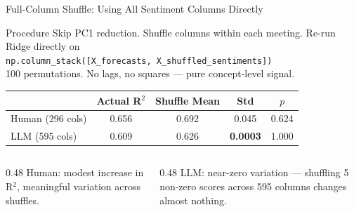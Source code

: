 \documentclass[10pt,aspectratio=169]{beamer}
\begin{document}
\begin{frame}{Full-Column Shuffle: Using All Sentiment Columns Directly}
  \vspace{-4pt}
  \begin{block}{Procedure}
    \centering\small
    Skip PC1 reduction. Shuffle columns within each meeting. Re-run Ridge directly on\\[2pt]
    \texttt{np.column\_stack([X\_forecasts, X\_shuffled\_sentiments])}\\[2pt]
    100 permutations. \quad No lags, no squares --- pure concept-level signal.
  \end{block}
  \vspace{4pt}
  \begin{center}
    \footnotesize
    \begin{tabular}{lcccc}
      \toprule
      & \textbf{Actual R$^2$} & \textbf{Shuffle Mean} & \textbf{Std} & \textbf{$p$} \\
      \midrule
      Human (296 cols)  & 0.656 & 0.692 & 0.045 & 0.624 \\
      LLM (595 cols)    & 0.609 & 0.626 & \textbf{0.0003} & 1.000 \\
      \bottomrule
    \end{tabular}
  \end{center}
  \vspace{4pt}
  \begin{columns}[T]
    \begin{column}{0.48\textwidth}
      \centering\small Human: modest increase in R$^2$, meaningful variation across shuffles.
    \end{column}
    \begin{column}{0.48\textwidth}
      \centering\small LLM: near-zero variation --- shuffling 5 non-zero scores across 595 columns changes almost nothing.
    \end{column}
  \end{columns}
\end{frame}
\end{document}
